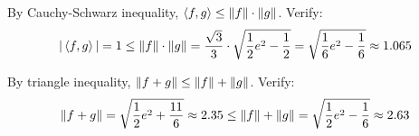 \begin{homeworkProblem}
By Cauchy-Schwarz inequality, $\langle f, g \rangle \leq \norm{f} \cdot \norm{g}$.
Verify:
\[
|\innerprod[f]{g}| = 1 \leq \norm{f}\cdot\norm{g}
= \frac{\sqrt{3}}{3} \cdot \sqrt{\frac{1}{2}e^2 - \frac{1}{2}}
= \sqrt{\frac{1}{6} e^2 - \frac{1}{6}} \approx 1.065
\]

By triangle inequality, $\norm{f + g} \leq \norm{f} + \norm{g}$. Verify:
\[
\norm{f + g} = \sqrt{\frac{1}{2}e^2 + \frac{11}{6}} \approx 2.35
\leq \norm{f} + \norm{g} = \sqrt{\frac{1}{2}e^2 - \frac{1}{6}} \approx 2.63
\]


\end{homeworkProblem}
